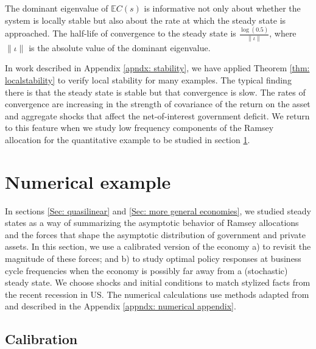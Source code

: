 \documentclass[thmsb,11pt]{article}
\begin{document}
The dominant  eigenvalue of $\mathbb{E}C(s)$ is informative not only about whether the system is locally stable but also about  the rate at which the steady state is approached.
The half-life of convergence to the steady state is  $\frac{\log(0.5)}{\|\iota\|}$, where $\|\iota\|$ is the absolute value of the dominant eigenvalue.

In work described in Appendix \ref{apndx: stability}, we have applied  Theorem \ref{thm: localstability} to verify local stability for many examples.
\color{black}
The typical finding there  is that the steady state is stable but that convergence is slow.
The rates of convergence are increasing in the strength of covariance of the return on the asset and aggregate shocks
that affect the net-of-interest government deficit. We return to this feature when we study low frequency components of the Ramsey allocation for the quantitative example to be studied in section \ref{sec: numerical results}.










\section{Numerical example}
\label{sec: numerical results}
In sections \ref{Sec: quasilinear} and \ref{Sec: more general economies},
we studied steady states as a way of summarizing the asymptotic  behavior of Ramsey allocations and the forces that shape  the asymptotic distribution of government and private assets.
In this section, we use a calibrated version of the economy  a) to revisit the magnitude of these forces; and  b) to study optimal policy responses
at business cycle frequencies when the economy is possibly far away from a (stochastic) steady state.
We choose shocks and initial conditions to match stylized facts from the  recent
recession in US. The numerical calculations use methods adapted from \cite{Evans2014}
and described  in the Appendix \ref{appndx: numerical appendix}. %



\subsection{Calibration}
\end{document}

